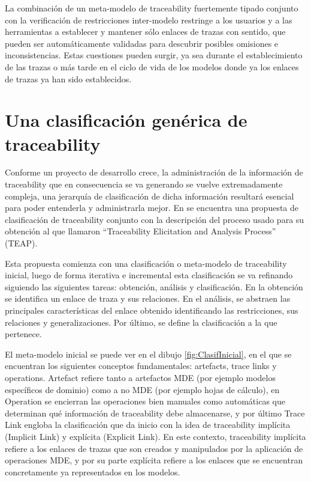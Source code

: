 \documentclass[a4paper,12pt,oneside]{book}
\begin{document}
La combinación de un meta-modelo de traceability fuertemente tipado conjunto con la verificación de restricciones inter-modelo restringe a los usuarios y a las herramientas a establecer y mantener sólo enlaces de trazas con sentido, que pueden ser automáticamente validadas para descubrir posibles omisiones e inconsistencias. Estas cuestiones pueden surgir, ya sea durante el establecimiento de las trazas o más tarde en el ciclo de vida de los modelos donde ya los enlaces de trazas ya han sido establecidos.

\section{Una clasificación genérica de traceability}
\label{sec:ClasificacionTraceability}

Conforme un proyecto de desarrollo crece, la administración de la información de traceability que en consecuencia se va generando se vuelve extremadamente compleja, una jerarquía de clasificación de dicha información resultará esencial para poder entenderla y administrarla mejor. En \cite{PaigeOlsenKolovosZschalerPower} se encuentra una propuesta de clasificación de traceability conjunto con la descripción del proceso usado para su obtención al que llamaron ``Traceability Elicitation and Analysis Process'' (TEAP).

Esta propuesta comienza con una clasificación o meta-modelo de traceability inicial, luego de forma iterativa e incremental esta clasificación se va refinando siguiendo las siguientes tareas: obtención, análisis y clasificación. En la obtención se identifica un enlace de traza y sus relaciones. En el análisis, se abstraen las principales características del enlace obtenido identificando las restricciones, sus relaciones y generalizaciones. Por último, se define la clasificación a la que pertenece.

El meta-modelo inicial se puede ver en el dibujo \ref{fig:ClasifInicial}, en el que se encuentran los siguientes conceptos fundamentales: artefacts, trace links y operations. Artefact refiere tanto a artefactos MDE (por ejemplo modelos específicos de dominio) como a no MDE (por ejemplo hojas de cálculo), en Operation se encierran las operaciones bien manuales como automáticas que determinan qué información de traceability debe almacenarse, y por último Trace Link engloba la clasificación que da inicio con la idea de traceability implícita (Implicit Link) y explícita (Explicit Link). En este contexto, traceability implícita refiere a los enlaces de trazas que son creados y manipulados por la aplicación de operaciones MDE, y por su parte explícita refiere a los enlaces que se encuentran concretamente ya representados en los modelos.
\end{document}
